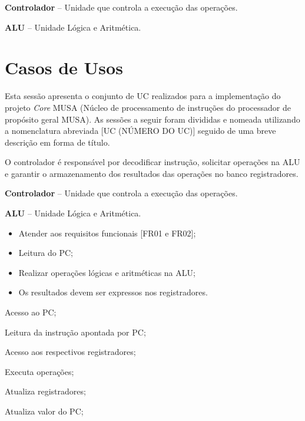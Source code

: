 \documentclass{article}
\begin{document}
\textbf{Controlador} – Unidade que controla a execução das operações.

\textbf{ALU} – Unidade L\'{o}gica e Aritm\'{e}tica.
  
  \section{Casos de Usos}
  Esta sessão apresenta o conjunto de UC realizados para a implementação do projeto \textit{Core }MUSA (Núcleo de processamento de instruções do processador de propósito geral MUSA). As sessões a seguir foram divididas e nomeada utilizando a nomenclatura abreviada [UC (NÚMERO DO UC)] seguido de uma breve descrição em forma de título.

  O controlador é responsável por decodificar instrução, solicitar operações na ALU e garantir o armazenamento dos resultados das operações no banco registradores.
  
  \actors
    \begin{description}
     \item \textbf{Controlador} – Unidade que controla a execução das operações.
     \item \textbf{ALU} – Unidade L\'{o}gica e Aritm\'{e}tica.
    \end{description}
    
  \preconditions 
    \begin{itemize}
     \item Atender aos requisitos funcionais [FR01 e FR02];
     \item Leitura do PC;
     \item Realizar operações lógicas e aritméticas na ALU;
    \end{itemize}

  \postconditions
    \begin{itemize}
     \item Os resultados devem ser expressos nos registradores.
    \end{itemize}

  
  \begin{mainflow}
    \item Acesso ao PC;
    \item Leitura da instrução apontada por PC;
    \item Acesso aos respectivos registradores;
    \item Executa operações;
    \item Atualiza registradores;
    \item Atualiza valor do PC;
  \end{mainflow}
\end{document}

